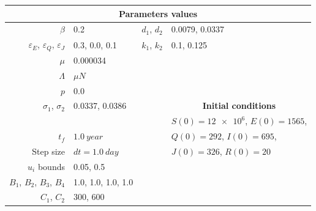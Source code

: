 \begin{frame}{}
    \begin{table}
        \begin{center}
            \begin{tabular}{@{}rlrl@{}}
                \toprule
                \multicolumn{4}{c}{\bf{Parameters values}}
                \\
                \midrule
                $\beta$
                & \num{0.2}
                & $d_1$, $d_2$
                & \num{0.0079}, \num{0.0337}
                \\
                $\varepsilon_E$, 
                $\varepsilon_Q$,
                $\varepsilon_J$
                & \num{0.3}, \num{0.0}, \num{0.1}
                &
                $k_1$, $k_2$ 
                & 
                \num{0.1},
                \num{0.125}
                \\
                $\mu$
                & \num{0.000034}
                \\
                $\Lambda$
                & $\mu N$
                \\
                $p$
                & \num{0.0}
                \\
                $\sigma_1$, $\sigma_2$
                & \num{0.0337}, \num{0.0386}
                && \multicolumn{1}{c}{\bf{Initial conditions}}
                \\
                \cmidrule{4-4}
                &&& $S(0)=\num{12e6}$, $E(0)=1565$,
                \\
                $t_f$
                & $\SI{1.0}{year}$
                && $Q(0)=292$, $I(0)=\num{695}$,
                \\
                Step size
                & $dt=\SI{1.0}{day}$
                && $J(0)=\num{326}$, $R(0)=\num{20}$
                \\
                $u_i$ bounds
                & \num{.05}, \num{0.5}
                \\
                $B_1$, $B_2$, $B_3$, $B_4$
                & \num{1.0}, \num{1.0}, \num{1.0}, \num{1.0}
                \\
                $C_1$, $C_2$
                & \num{300}, \num{600}
                \\
                \bottomrule
            \end{tabular}
        \end{center}
    \end{table}
\end{frame}

